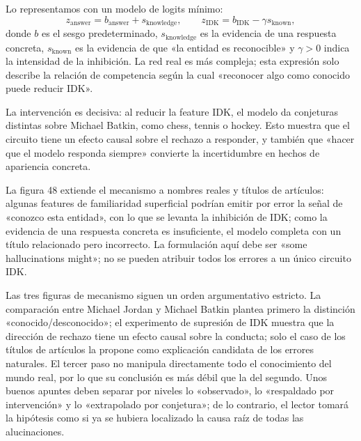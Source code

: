 Lo representamos con un modelo de logits mínimo:
\[
z_{\text{answer}}=b_{\text{answer}}+s_{\text{knowledge}},\qquad
z_{\text{IDK}}=b_{\text{IDK}}-\gamma s_{\text{known}},
\]
donde $b$ es el sesgo predeterminado, $s_{\text{knowledge}}$ es la evidencia de una respuesta concreta, $s_{\text{known}}$ es la evidencia de que «la entidad es reconocible» y $\gamma>0$ indica la intensidad de la inhibición. La red real es más compleja; esta expresión solo describe la relación de competencia según la cual «reconocer algo como conocido puede reducir IDK».


La intervención es decisiva: al reducir la feature IDK, el modelo da conjeturas distintas sobre Michael Batkin, como chess, tennis o hockey. Esto muestra que el circuito tiene un efecto causal sobre el rechazo a responder, y también que «hacer que el modelo responda siempre» convierte la incertidumbre en hechos de apariencia concreta.


La figura 48 extiende el mecanismo a nombres reales y títulos de artículos: algunas features de familiaridad superficial podrían emitir por error la señal de «conozco esta entidad», con lo que se levanta la inhibición de IDK; como la evidencia de una respuesta concreta es insuficiente, el modelo completa con un título relacionado pero incorrecto. La formulación aquí debe ser «some hallucinations might»; no se pueden atribuir todos los errores a un único circuito IDK.

Las tres figuras de mecanismo siguen un orden argumentativo estricto. La comparación entre Michael Jordan y Michael Batkin plantea primero la distinción «conocido/desconocido»; el experimento de supresión de IDK muestra que la dirección de rechazo tiene un efecto causal sobre la conducta; solo el caso de los títulos de artículos la propone como explicación candidata de los errores naturales. El tercer paso no manipula directamente todo el conocimiento del mundo real, por lo que su conclusión es más débil que la del segundo. Unos buenos apuntes deben separar por niveles lo «observado», lo «respaldado por intervención» y lo «extrapolado por conjetura»; de lo contrario, el lector tomará la hipótesis como si ya se hubiera localizado la causa raíz de todas las alucinaciones.

